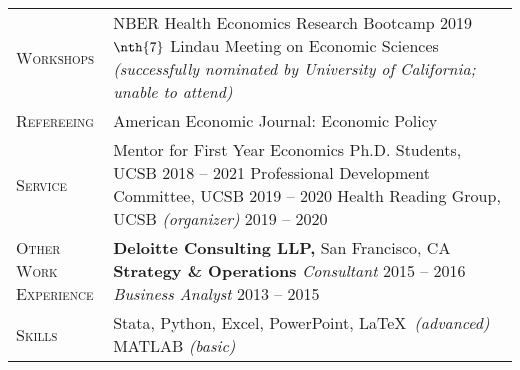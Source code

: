 \documentclass[11pt]{article}
\begin{document}
\begin{tabularx}{\textwidth}{@{}Y Z@{}}
	\textsc{Workshops} & 
	NBER Health Economics Research Bootcamp \hfill 2019
	\vspace{6pt} \newline
	$\nth{7}$ Lindau Meeting on Economic Sciences \newline \textit{(successfully nominated by University of California; unable to attend)} 
	\\ \addlinespace[20pt] 
	
	\textsc{Refereeing}  & 
	American Economic Journal: Economic Policy
	 \\ \addlinespace[20pt] 
	
	\textsc{Service} & 
	Mentor for First Year Economics Ph.D. Students, UCSB \hfill 2018 -- 2021
	\vspace{3pt} \newline
	Professional Development Committee, UCSB \hfill 2019 -- 2020
	\vspace{3pt} \newline
	Health Reading Group, UCSB \textit{(organizer)} \hfill 2019 -- 2020 
	\vspace{0pt}
	\\ \addlinespace[20pt] 
	
	
	\textsc{Other Work \newline Experience}  & 
	\textbf{Deloitte Consulting LLP,} San Francisco, CA
	\vspace{0pt} \newline
	\textbf{Strategy \& Operations} 
	\vspace{3pt} \newline
	\textit{Consultant} \hfill 2015 -- 2016
	\vspace{0pt} \newline
	\textit{Business Analyst} \hfill 2013 -- 2015
	\vspace{0pt}
	\\ \addlinespace[20pt] 
	
	\textsc{Skills}  & 
	Stata, Python, Excel, PowerPoint, \LaTeX \ \textit{(advanced)}
	\vspace{3pt} \newline
	MATLAB \textit{(basic)}
	\\ 
	

\end{tabularx}
\end{document}
